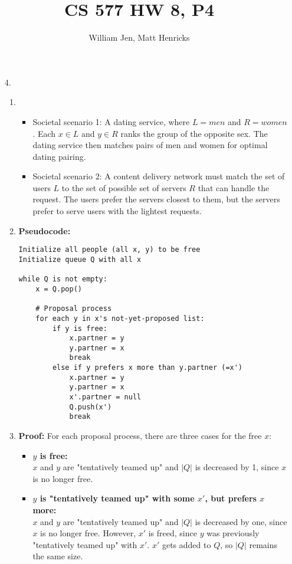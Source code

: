 \documentclass{article}
\title{CS 577 HW 8, P4}
\author{William Jen, Matt Henricks}
\date{}
\begin{document}
\maketitle


\begin{enumerate}
    \item[4.]
        \begin{enumerate}
        \item
            \begin{itemize}
                \item Societal scenario 1: A dating service, where $L = men$ and $R = women$. Each $x \in L$ and $y \in R$ ranks the group of the opposite sex. The dating service then matches pairs of men and women for optimal dating pairing. 
                \item Societal scenario 2: A content delivery network must match the set of users $L$ to the set of 
                    possible set of servers $R$ that can handle the request. The users prefer the servers closest
                    to them, but the servers prefer to serve users with the lightest requests. 
            \end{itemize}
            
        \item \textbf{Pseudocode:}
            \begin{verbatim}
Initialize all people (all x, y) to be free
Initialize queue Q with all x

while Q is not empty:
    x = Q.pop()  
    
    # Proposal process
    for each y in x's not-yet-proposed list:
        if y is free:
            x.partner = y
            y.partner = x
            break
        else if y prefers x more than y.partner (=x')
            x.partner = y
            y.partner = x
            x'.partner = null
            Q.push(x')
            break
            \end{verbatim}
        
        \item \textbf{Proof:}
            For each proposal process, there are three cases for the free $x$:
            \begin{itemize}
                \item \textbf{$y$ is free:} \\
                $x$ and $y$ are "tentatively teamed up" and $|Q|$ is decreased by 1, since $x$ is no longer free.
                
                \item \textbf{$y$ is "tentatively teamed up" with some $x'$, but prefers $x$ more:} \\
                $x$ and $y$ are "tentatively teamed up" and $|Q|$ is decreased by one, since $x$ is no longer free. However, $x'$ is freed, since $y$ was previously "tentatively teamed up" with $x'$. $x'$ gets added to $Q$, so $|Q|$ remains the same size.
                

\end{itemize}
\end{enumerate}
\end{enumerate}
\end{document}

